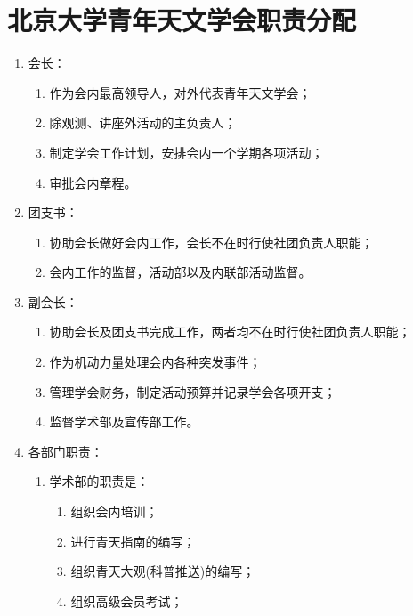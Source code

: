 \chapter{北京大学青年天文学会职责分配}

\begin{enumerate}
    \item 会长：
    
    \begin{enumerate}
        \item 作为会内最高领导人，对外代表青年天文学会；
        \item 除观测、讲座外活动的主负责人；
        \item 制定学会工作计划，安排会内一个学期各项活动；
        \item 审批会内章程。
    \end{enumerate}
    
    \item 团支书：
    
    \begin{enumerate}
        \item 协助会长做好会内工作，会长不在时行使社团负责人职能；
        \item 会内工作的监督，活动部以及内联部活动监督。
    \end{enumerate}
    
    \item 副会长：
    
    \begin{enumerate}
        \item 协助会长及团支书完成工作，两者均不在时行使社团负责人职能；
        \item 作为机动力量处理会内各种突发事件；
        \item 管理学会财务，制定活动预算并记录学会各项开支；
        \item 监督学术部及宣传部工作。
    \end{enumerate}
    
    \item 各部门职责：
    
    \begin{enumerate}
        \item 学术部的职责是：
        
        \begin{enumerate}
            \item 组织会内培训；
            \item 进行青天指南的编写；
            \item 组织青天大观(科普推送)的编写；
            \item 组织高级会员考试；
        \end{enumerate}


\end{enumerate}
\end{enumerate}
